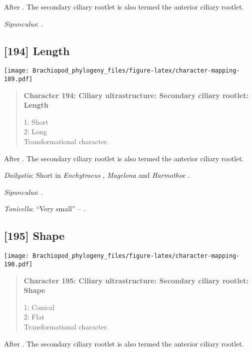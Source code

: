 \documentclass[openany]{book}
\theoremstyle{definition}
\theoremstyle{definition}
\theoremstyle{definition}
\theoremstyle{remark}
\begin{document}
After \citet{Lundin2009}. The secondary ciliary rootlet is also termed
the anterior ciliary rootlet.

\hypertarget{Sipunculus-coding-193}{}
\emph{Sipunculus}: \citet{Reed1982}.

\subsection*{{[}194{]} Length}\label{length-1}

\texttt{[image: Brachiopod\_phylogeny\_files/figure-latex/character-mapping-189.pdf]}

\begin{quote}
\textbf{Character 194: Ciliary ultrastructure: Secondary ciliary
rootlet: Length}

1: Short\\
2: Long\\
Transformational character.
\end{quote}

After \citet{Lundin2009}. The secondary ciliary rootlet is also termed
the anterior ciliary rootlet.

\hypertarget{Dailyatia-coding-194}{}
\emph{Dailyatia}: Short in \emph{Enchytraeus} \citep{Reger1967},
\emph{Magelona} \citep{Bartolomaeus1995} and \emph{Harmothoe}
\citep{Holborow1969}.

\hypertarget{Sipunculus-coding-194}{}
\emph{Sipunculus}: \citet{Reed1982}.

\hypertarget{Tonicella-coding-194}{}
\emph{Tonicella}: ``Very small'' -- \citet{Luter1995}.

\subsection*{{[}195{]} Shape}\label{shape-1}

\texttt{[image: Brachiopod\_phylogeny\_files/figure-latex/character-mapping-190.pdf]}

\begin{quote}
\textbf{Character 195: Ciliary ultrastructure: Secondary ciliary
rootlet: Shape}

1: Conical\\
2: Flat\\
Transformational character.
\end{quote}

After \citet{Lundin2009}. The secondary ciliary rootlet is also termed
the anterior ciliary rootlet.
\end{document}
